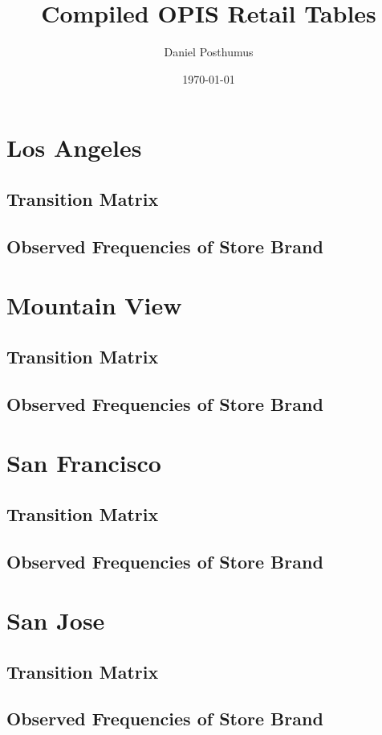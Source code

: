\documentclass[12pt]{article}  %
\title{Compiled OPIS Retail Tables}
\author{Daniel Posthumus}
\date{\today}
\begin{document}
\begin{landscape}

\maketitle 

\tiny 

\section{Los Angeles}
\subsection{Transition Matrix}

\subsection{Observed Frequencies of Store Brand}


\section{Mountain View} 
\subsection{Transition Matrix}

\subsection{Observed Frequencies of Store Brand}


\section{San Francisco}
\subsection{Transition Matrix}
 
\subsection{Observed Frequencies of Store Brand}


\section{San Jose}
\subsection{Transition Matrix}

\subsection{Observed Frequencies of Store Brand}


\end{landscape}
\end{document}
